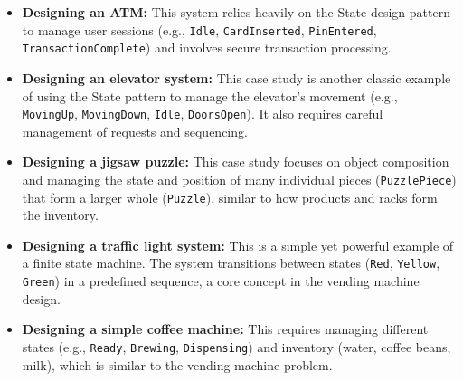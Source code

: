 \begin{itemize}
\item
\protect{}\label{OuBkBDscvK2ljklZuIMis}
\textbf{Designing an ATM:} This system relies heavily on the State design pattern to manage user sessions (e.g., \texttt{Idle}, \texttt{CardInserted}, \texttt{PinEntered}, \texttt{TransactionComplete}) and involves secure transaction processing.
\item
\protect{}\label{drpUt4S-LMUWerAOhiKyV}
\textbf{Designing an elevator system:} This case study is another classic example of using the State pattern to manage the elevator's movement (e.g., \texttt{MovingUp}, \texttt{MovingDown}, \texttt{Idle}, \texttt{DoorsOpen}). It also requires careful management of requests and sequencing.
\item
\protect{}\label{PS-Z57ektm7Etu69Nkgha}
\textbf{Designing a jigsaw puzzle:} This case study focuses on object composition and managing the state and position of many individual pieces (\texttt{PuzzlePiece}) that form a larger whole (\texttt{Puzzle}), similar to how products and racks form the inventory.
\item
\protect{}\label{aootFbQ5GSwzuctbnv1Jf}
\textbf{Designing a traffic light system:} This is a simple yet powerful example of a finite state machine. The system transitions between states (\texttt{Red}, \texttt{Yellow}, \texttt{Green}) in a predefined sequence, a core concept in the vending machine design.
\item
\protect{}\label{Hjv1w0uiVsUkraKI3uraj}
\textbf{Designing a simple coffee machine:} This requires managing different states (e.g., \texttt{Ready}, \texttt{Brewing}, \texttt{Dispensing}) and inventory (water, coffee beans, milk), which is similar to the vending machine problem.
\end{itemize}

